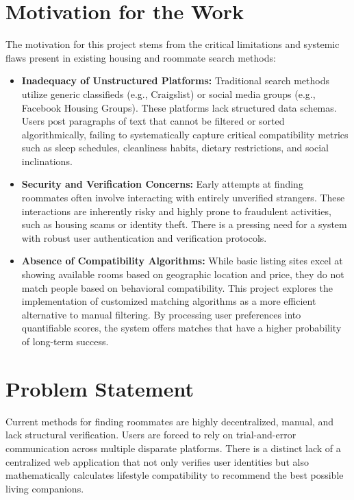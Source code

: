 \documentclass[12pt,a4paper]{report}
\begin{document}
\section{Motivation for the Work}
The motivation for this project stems from the critical limitations and systemic flaws present in existing housing and roommate search methods:
\begin{itemize}
    \item \textbf{Inadequacy of Unstructured Platforms:} Traditional search methods utilize generic classifieds (e.g., Craigslist) or social media groups (e.g., Facebook Housing Groups). These platforms lack structured data schemas. Users post paragraphs of text that cannot be filtered or sorted algorithmically, failing to systematically capture critical compatibility metrics such as sleep schedules, cleanliness habits, dietary restrictions, and social inclinations.
    \item \textbf{Security and Verification Concerns:} Early attempts at finding roommates often involve interacting with entirely unverified strangers. These interactions are inherently risky and highly prone to fraudulent activities, such as housing scams or identity theft. There is a pressing need for a system with robust user authentication and verification protocols.
    \item \textbf{Absence of Compatibility Algorithms:} While basic listing sites excel at showing available rooms based on geographic location and price, they do not match people based on behavioral compatibility. This project explores the implementation of customized matching algorithms as a more efficient alternative to manual filtering. By processing user preferences into quantifiable scores, the system offers matches that have a higher probability of long-term success.
\end{itemize}

\section{Problem Statement}
Current methods for finding roommates are highly decentralized, manual, and lack structural verification. Users are forced to rely on trial-and-error communication across multiple disparate platforms. There is a distinct lack of a centralized web application that not only verifies user identities but also mathematically calculates lifestyle compatibility to recommend the best possible living companions.
\end{document}
